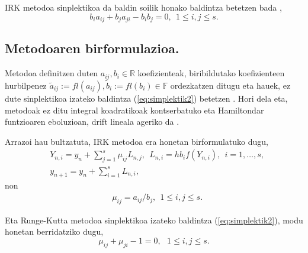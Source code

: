 IRK metodoa sinplektikoa da baldin soilik honako baldintza betetzen bada  \cite{JMSanz-Serna1994} ,
\begin{equation}
\label{eq:simplektik2}
b_{i}a_{ij}+b_{j}a_{ji}-b_{i}b_{j}=0, \ \ 1 \leqslant i,j \leqslant s.
\end{equation}   

\subsection{Metodoaren birformulazioa.}

Metodoa definitzen duten $a_{ij},b_i  \in \mathbb{R}$ koefizienteak, biribildutako koefizienteen hurbilpenez $\tilde a_{ij}:=fl(a_{ij}),\tilde b_i:=fl(b_i) \in \mathbb{F}$  ordezkatzen ditugu eta hauek, ez dute sinplektikoa izateko baldintza (\ref{eq:simplektik2}) betetzen . Hori dela eta, metodoak ez ditu integral koadratikoak kontserbatuko eta Hamiltondar funtzioaren eboluzioan, drift lineala ageriko da \cite{JMSanz-Serna1994}.    
  
Arrazoi hau bultzatuta, IRK metodoa era honetan birformulatuko dugu,
\begin{align}
\label{eq:irk1}
&Y_{n,i}=y_n+ \sum\limits_{j=1}^{s} \mu_{ij} L_{n,j},  \ \ L_{n,i}=hb_if(Y_{n,i}), \ \ i=1,\dots,s,\\
\label{eq:irk2}
&y_{n+1}=y_n+\sum\limits_{i=1}^{s} L_{n,i},
\end{align}
non 
\begin{align*}
&\mu_{ij}=a_{ij}/{b_j}, \ \ 1 \leqslant i,j \leqslant s.
\end{align*}

Eta Runge-Kutta metodoa sinplektikoa izateko baldintza (\ref{eq:simplektik2}), modu honetan berridatziko dugu,
\begin{equation}
\label{eq:sinplekmij}
\mu_{ij}+\mu_{ji}-1=0, \ \ \ 1 \leqslant i,j \leqslant s.
\end{equation}
 
